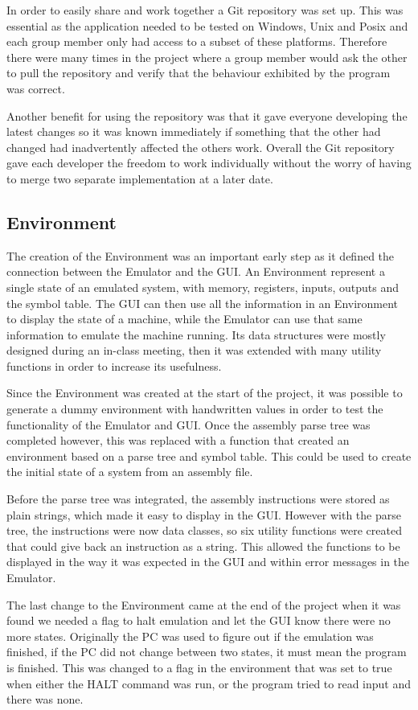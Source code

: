 \documentclass[10point]{article}
\begin{document}
In order to easily share and work together a Git repository was set up.  This was essential as the application needed to be tested on Windows, Unix and Posix and each group member only had access to a subset of these platforms.  Therefore there were many times in the project where a group member would ask the other to pull the repository and verify that the behaviour exhibited by the program was correct.

Another benefit for using the repository was that it gave everyone developing the latest changes so it was known immediately if something that the other had changed had inadvertently affected the others work.  Overall the Git repository gave each developer the freedom to work individually without the worry of having to merge two separate implementation at a later date.

\subsection{Environment}
The creation of the Environment was an important early step as it defined the connection between the Emulator and the GUI. An Environment represent a single state of an emulated system, with memory, registers, inputs, outputs and the symbol table. The GUI can then use all the information in an Environment to display the state of a machine, while the Emulator can use that same information to emulate the machine running. Its data structures were mostly designed during an in-class meeting, then it was extended with many utility functions in order to increase its usefulness. 

Since the Environment was created at the start of the project, it was possible to generate a dummy environment with handwritten values in order to test the functionality of the Emulator and GUI. Once the assembly parse tree was completed however, this was replaced with a function that created an environment based on a parse tree and symbol table. This could be used to create the initial state of a system from an assembly file.

Before the parse tree was integrated, the assembly instructions were stored as plain strings, which made it easy to display in the GUI. However with the parse tree, the instructions were now data classes, so six utility functions were created that could give back an instruction as a string. This allowed the functions to be displayed in the way it was expected in the GUI and within error messages in the Emulator.

The last change to the Environment came at the end of the project when it was found we needed a flag to halt emulation and let the GUI know there were no more states. Originally the PC was used to figure out if the emulation was finished, if the PC did not change between two states, it must mean the program is finished. This was changed to a flag in the environment that was set to true when either the HALT command was run, or the program tried to read input and there was none.
\end{document}

